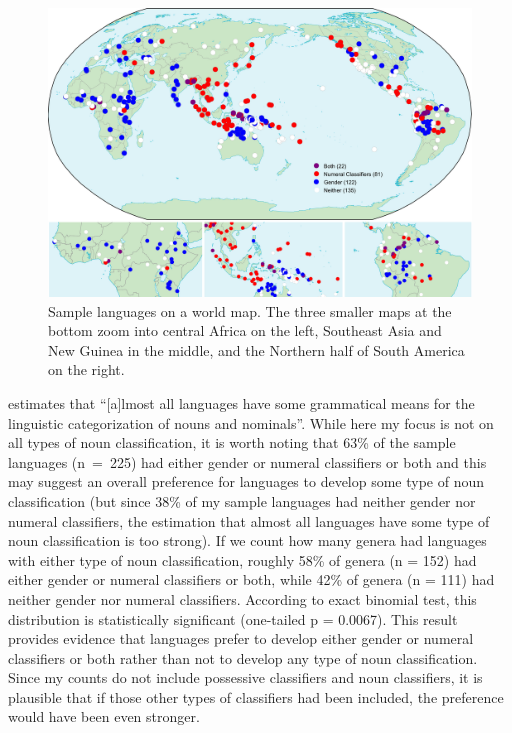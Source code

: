 \documentclass[output=collectionpaper]{langsci/langscibook}
\begin{document}
\begin{figure}
\includegraphics[width=\textwidth]{figures/13/Fig2_MapSample}
\caption{Sample languages on a world map. The three smaller maps at the bottom zoom into central Africa on the left, Southeast Asia and New Guinea in the middle, and the Northern half of South America on the right.}
\label{fig:Sinne:2}
\end{figure}

\citet[1]{Aikhenvald2000} estimates that ``[a]lmost all languages have some grammatical means for the linguistic categorization of nouns and nominals''. While here my focus is not on all types of noun classification, it is worth noting that 63\% of the sample languages (n~=~225) had either gender or numeral classifiers or both and this may suggest an overall preference for languages to develop some type of noun classification (but since 38\% of my sample languages had neither gender nor numeral classifiers, the estimation that almost all languages have some type of noun classification is too strong). If we count how many genera had languages with either type of noun classification, roughly 58\% of genera (n = 152) had either gender or numeral classifiers or both, while 42\% of genera (n = 111) had neither gender nor numeral classifiers. According to exact binomial test, this distribution is statistically significant (one-tailed p = 0.0067). This result provides evidence that languages prefer to develop either gender or numeral classifiers or both rather than not to develop any type of noun classification. Since my counts do not include possessive classifiers and noun classifiers, it is plausible that if those other types of classifiers had been included, the preference would have been even stronger.
\end{document}
